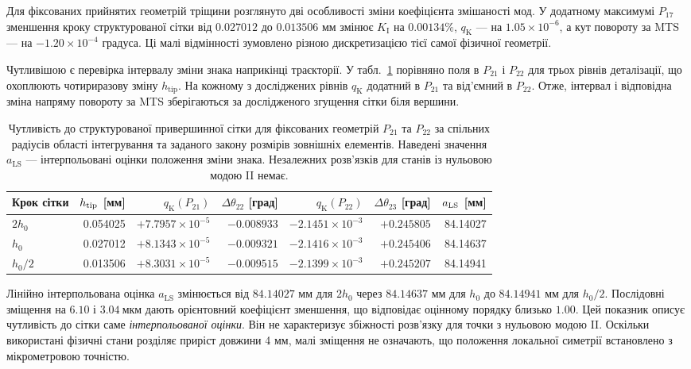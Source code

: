 \documentclass[a4paper,12pt]{article}
\begin{document}
Для фіксованих прийнятих геометрій тріщини розглянуто дві особливості зміни коефіцієнта
змішаності мод. У додатному максимумі $P_{17}$ зменшення кроку структурованої сітки від $0.027012$ до $0.013506$ мм
змінює $K_{\mathrm{I}}$ на $0.00134\%$, $q_{\mathrm{K}}$ — на $1.05\times10^{-6}$, а кут повороту за MTS — на $-1.20\times10^{-4}$ градуса. Ці малі відмінності
зумовлено різною дискретизацією тієї самої фізичної геометрії.

Чутливішою є перевірка інтервалу зміни знака наприкінці траєкторії. У табл.~\ref{tab:tipmesh} порівняно поля в
$P_{21}$ і $P_{22}$ для трьох рівнів деталізації, що охоплюють чотириразову зміну $h_{\mathrm{tip}}$. На кожному з
досліджених рівнів $q_{\mathrm{K}}$ додатний в $P_{21}$ та від’ємний в $P_{22}$. Отже, інтервал і відповідна зміна напряму
повороту за MTS зберігаються за дослідженого згущення сітки біля вершини.

\begin{table}[htbp]
\centering
\small
\setlength{\tabcolsep}{2.6pt}
\caption{Чутливість до структурованої привершинної сітки для фіксованих геометрій $P_{21}$ та $P_{22}$ за спільних
радіусів області інтегрування та заданого закону розмірів зовнішніх елементів. Наведені значення
$a_{\mathrm{LS}}$ — інтерпольовані оцінки положення зміни знака. Незалежних розв’язків для станів із нульовою
модою II немає.}
\label{tab:tipmesh}
\begin{tabular}{lrrrrrr}
\toprule
Крок сітки & $h_{\rm tip}$ [мм] & $q_{\mathrm{K}}(P_{21})$ & $\Delta\theta_{22}$ [град] & $q_{\mathrm{K}}(P_{22})$ & $\Delta\theta_{23}$ [град] & $a_{\rm LS}$ [мм]\\
\midrule
$2h_0$ & 0.054025 & $+7.7957\times10^{-5}$ & $-0.008933$ &
$-2.1451\times10^{-3}$ & $+0.245805$ & 84.14027\\
$h_0$ & 0.027012 & $+8.1343\times10^{-5}$ & $-0.009321$ &
$-2.1416\times10^{-3}$ & $+0.245406$ & 84.14637\\
$h_0/2$ & 0.013506 & $+8.3031\times10^{-5}$ & $-0.009515$ &
$-2.1399\times10^{-3}$ & $+0.245207$ & 84.14941\\
\bottomrule
\end{tabular}
\end{table}

Лінійно інтерпольована оцінка $a_{\mathrm{LS}}$ змінюється від $84.14027$ мм для $2h_0$ через $84.14637$ мм для $h_0$ до $84.14941$ мм для $h_0/2$.
Послідовні зміщення на $6.10$ і $3.04~\text{мкм}$ дають орієнтовний коефіцієнт зменшення, що відповідає оцінному порядку близько $1.00$. Цей показник описує чутливість до сітки саме
\emph{інтерпольованої оцінки}. Він не характеризує збіжності розв’язку для точки з нульовою модою II. Оскільки використані фізичні стани розділяє
приріст довжини 4 мм, малі зміщення не означають, що положення локальної симетрії встановлено з
мікрометровою точністю.
\end{document}
